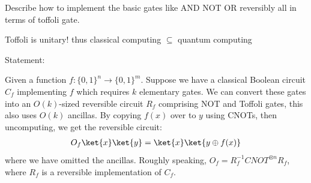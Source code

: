 Describe how to implement the basic gates like AND NOT OR reversibly all in terms of toffoli gate. 

Toffoli is unitary! thus classical computing $\subseteq$ quantum computing

Statement:

Given a function $f: \{0,1\}^n \rightarrow \{0,1\}^m$. Suppose we have a classical Boolean circuit $C_f$ implementing $f$ which requires $k$ elementary gates. We can convert these gates into an $O(k)$-sized reversible circuit $R_f$ comprising NOT and Toffoli gates, this also uses $O(k)$ ancillas. By copying $f(x)$ over to $y$ using CNOTs, then uncomputing, we get the reversible circuit:
\begin{align*}
    O_f\ket{x}\ket{y} = \ket{x}\ket{y \oplus f(x)}
\end{align*}
where we have omitted the ancillas. Roughly speaking, $O_f = R_f^{-1}CNOT^{\otimes n}R_f$, where $R_f$ is a reversible implementation of $C_f$.
























































% 
% 
% 

